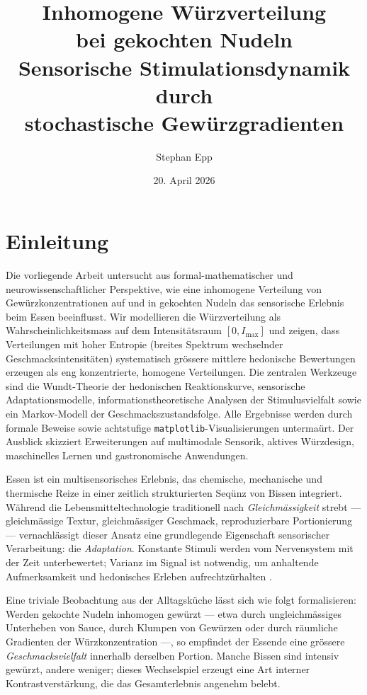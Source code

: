 ﻿\documentclass[12pt,a4paper]{article}
\title{\textbf{Inhomogene Würzverteilung\\ bei gekochten Nudeln}\\[-0.1em] \Large Sensorische Stimulationsdynamik durch\\ stochastische Gewürzgradienten}
\author{Stephan Epp}
\date{20. April 2026}
\theoremstyle{definition}
\begin{document}
\maketitle
\tableofcontents
\newpage

\section{Einleitung}
Die vorliegende Arbeit untersucht aus formal-mathematischer und
neurowissenschaftlicher Perspektive, wie eine inhomogene Verteilung von
Gewürzkonzentrationen auf und in gekochten Nudeln das sensorische Erlebnis
beim Essen beeinflusst. Wir modellieren die Würzverteilung als
Wahrscheinlichkeitsmass auf dem Intensitätsraum $[0, I_{\max}]$ und
zeigen, dass Verteilungen mit hoher Entropie (breites Spektrum wechselnder
Geschmacksintensitäten) systematisch grössere mittlere hedonische
Bewertungen erzeugen als eng konzentrierte, homogene Verteilungen. Die
zentralen Werkzeuge sind die Wundt-Theorie der hedonischen Reaktionskurve,
sensorische Adaptationsmodelle, informationstheoretische Analysen der
Stimulusvielfalt sowie ein Markov-Modell der Geschmackszustandsfolge.
Alle Ergebnisse werden durch formale Beweise sowie achtstufige
\texttt{matplotlib}-Visualisierungen untermaürt. Der Ausblick skizziert
Erweiterungen auf multimodale Sensorik, aktives Würzdesign, maschinelles
Lernen und gastronomische Anwendungen.

Essen ist ein multisensorisches Erlebnis, das chemische, mechanische und
thermische Reize in einer zeitlich strukturierten Seqünz von Bissen
integriert. Während die Lebensmitteltechnologie traditionell nach
\emph{Gleichmässigkeit} strebt --- gleichmässige Textur, gleichmässiger
Geschmack, reproduzierbare Portionierung --- vernachlässigt dieser Ansatz
eine grundlegende Eigenschaft sensorischer Verarbeitung: die \emph{Adaptation}.
Konstante Stimuli werden vom Nervensystem mit der Zeit unterbewertet; Varianz
im Signal ist notwendig, um anhaltende Aufmerksamkeit und hedonisches Erleben
aufrechtzürhalten \cite{rolls2007,kringelbach2015}.

Eine triviale Beobachtung aus der Alltagsküche lässt sich wie folgt
formalisieren: Werden gekochte Nudeln inhomogen gewürzt --- etwa durch
ungleichmässiges Unterheben von Sauce, durch Klumpen von Gewürzen oder
durch räumliche Gradienten der Würzkonzentration ---, so empfindet der
Essende eine grössere \emph{Geschmacksvielfalt} innerhalb derselben Portion.
Manche Bissen sind intensiv gewürzt, andere weniger; dieses Wechselspiel
erzeugt eine Art interner Kontrastverstärkung, die das Gesamterlebnis
angenehm belebt.
\end{document}
